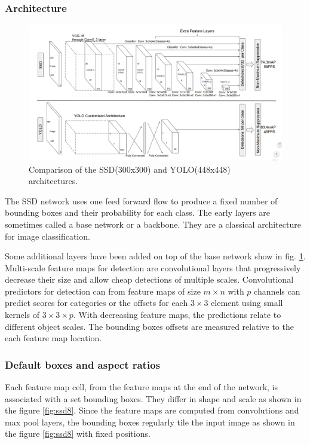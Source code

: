 \documentclass[a4paper,12pt,titlepage, twoside]{article}
\numberwithin{figure}{section}
\begin{document}
\subsubsection{Architecture}

\begin{figure}[h!]
\centering
\includegraphics[width=1\linewidth]{fig/SSDvsYOLO.png}
\caption{Comparison of the SSD\cite{liu2016ssd}(300x300) and YOLO\cite{redmon2016you}(448x448) architectures.}
\label{fig:ssd_vs_yolo}
\end{figure}

The SSD network uses one feed forward flow to produce a fixed number of bounding boxes and their probability for each class. The early layers are sometimes called a base network or a backbone. They are a classical architecture for image classification. 

Some additional layers have been added on top of the base network show in fig. \ref{fig:ssd_vs_yolo}. Multi-scale feature maps for detection are convolutional layers that progressively decrease their size and allow cheap detections of multiple scales. Convolutional predictors for detection can from feature maps of size $m \times n$ with $p$ channels can predict scores for categories or the offsets for each $3 \times 3$ element  using small kernels of $3 \times 3 \times p$. With decreasing feature maps, the predictions relate to different object scales. The bounding boxes offsets are measured relative to the each feature map location. 

\subsubsection{Default boxes and aspect ratios}
Each feature map cell, from the feature maps at the end of the network, is associated with a set bounding boxes. They differ in shape and scale as shown in the figure \ref{fig:ssd8}. Since the feature maps are computed from convolutions and max pool layers, the bounding boxes regularly tile the input image as shown in the figure \ref{fig:ssd8} with fixed positions.
\end{document}
